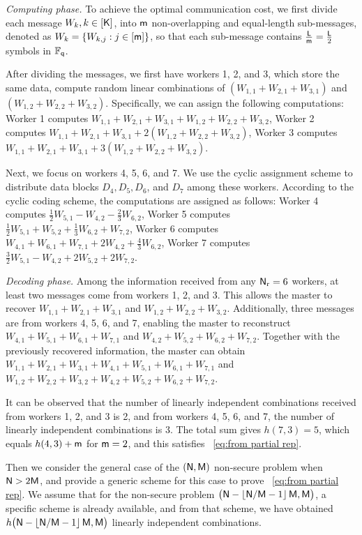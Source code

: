 \documentclass[conference,letterpaper]{IEEEtran}
\begin{document}
\begin{example}
{\it Computing phase.}
To achieve the optimal communication cost, we first divide each message $W_k, k \in [{\sf K}]$, into ${\sf m}$ non-overlapping and equal-length sub-messages, denoted as $W_{k} = \{W_{k,j} : j \in [{\sf m}]\}$, so that each sub-message contains $\frac{{\sf L}}{{\sf m}} = \frac{{\sf L}}{2}$ symbols in $\mathbb{F}_{{\sf q}}$.

After dividing the messages, we first have workers 1, 2, and 3, which store the same data, compute random linear combinations of $(W_{1,1} + W_{2,1} + W_{3,1})$ and $(W_{1,2} + W_{2,2} + W_{3,2})$. Specifically, we can assign the following computations:
 Worker 1 computes $W_{1,1} + W_{2,1} + W_{3,1} + W_{1,2} + W_{2,2} + W_{3,2}$,
 Worker 2 computes $W_{1,1} + W_{2,1} + W_{3,1} + 2(W_{1,2} + W_{2,2} + W_{3,2})$,
 Worker 3 computes $W_{1,1} + W_{2,1} + W_{3,1} + 3(W_{1,2} + W_{2,2} + W_{3,2})$.

  Next, we focus on workers 4, 5, 6, and 7. We use the cyclic assignment scheme to distribute data blocks $D_4, D_5, D_6$, and $D_7$ among these workers. According to the cyclic coding scheme, the computations are assigned as follows:
 Worker 4 computes $\frac{1}{2}W_{5,1} - W_{4,2} - \frac{2}{3}W_{6,2}$,
 Worker 5 computes $\frac{1}{2}W_{5,1} + W_{5,2} + \frac{1}{3}W_{6,2} + W_{7,2}$,
 Worker 6 computes $W_{4,1} + W_{6,1} + W_{7,1} + 2W_{4,2} + \frac{4}{3}W_{6,2}$,
 Worker 7 computes $\frac{3}{2}W_{5,1} - W_{4,2} + 2W_{5,2} + 2W_{7,2}$.


{\it Decoding phase.}
 Among the information received from any ${\sf N}_{\rm r} = 6$ workers, at least two messages come from workers 1, 2, and 3. This allows the master to recover $W_{1,1} + W_{2,1} + W_{3,1}$ and $W_{1,2} + W_{2,2} + W_{3,2}$. Additionally, three messages are from workers 4, 5, 6, and 7, enabling the master to reconstruct $W_{4,1} + W_{5,1} + W_{6,1} + W_{7,1}$ and $W_{4,2} + W_{5,2} + W_{6,2} + W_{7,2}$. Together with the previously recovered information, the master can obtain $W_{1,1} + W_{2,1} + W_{3,1} + W_{4,1} + W_{5,1} + W_{6,1} + W_{7,1}$ and $W_{1,2} + W_{2,2} + W_{3,2} + W_{4,2} + W_{5,2} + W_{6,2} + W_{7,2}$.

It can be observed that the number of linearly independent combinations received from workers 1, 2, and 3 is 2, and from workers 4, 5, 6, and 7, the number of linearly independent combinations is 3. The total sum gives $h(7, 3) = 5$, which equals $h(4, 3) + {\sf m}$ for ${\sf m} = 2$, and this satisfies ~\eqref{eq:from partial rep}.

 Then we consider the general case of the $({\sf N}, {\sf M})$ non-secure problem when ${\sf N} > 2{\sf M}$, and provide a generic scheme for this case to prove ~\eqref{eq:from partial rep}. We assume that for the non-secure problem $\big({\sf N} - \left\lfloor {\sf N}/{\sf M} - 1 \right\rfloor {\sf M}, {\sf M}\big)$, a specific scheme is already available, and from that scheme, we have obtained $h\big({\sf N} - \left\lfloor {\sf N}/{\sf M} - 1 \right\rfloor {\sf M}, {\sf M}\big)$ linearly independent combinations.

\end{example}
\end{document}
